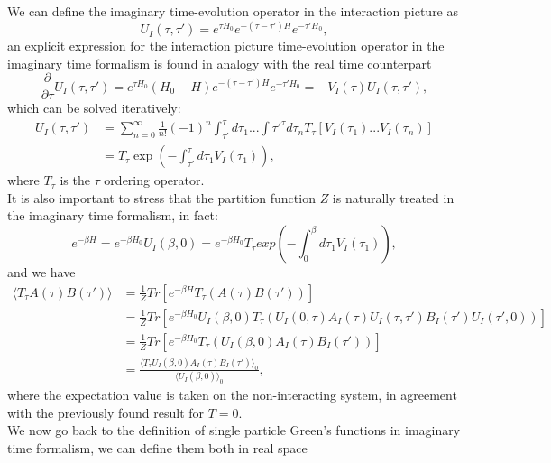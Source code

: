 We can define the imaginary time-evolution operator in the interaction picture as 
\begin{equation}
    U_I(\tau,\tau')=e^{\tau H_0}e^{-(\tau-\tau')H}e^{-\tau'H_0},
\end{equation}
an explicit expression for the interaction picture time-evolution operator in the imaginary time formalism is found in analogy with 
the real time counterpart
\begin{equation}
    \frac{\partial}{\partial\tau} U_I(\tau,\tau')=e^{\tau H_0}(H_0-H)e^{-(\tau-\tau')H}e^{-\tau'H_0}=-V_I(\tau)U_I(\tau,\tau'),
\end{equation}
which can be solved iteratively:
\begin{equation}
\begin{split}
    U_I(\tau,\tau')&=\sum_{n=0}^\infty\frac{1}{n!}(-1)^n\int_{\tau'}^{\tau}d\tau_1...\int{\tau'}^{\tau}d\tau_nT_\tau\left[V_I(\tau_1)...V_I(\tau_n)\right]\\
    &=T_\tau\exp{\left(-\int_{\tau'}^\tau d\tau_1V_I(\tau_1)\right)},
\end{split}
\end{equation}
where $T_\tau$ is the $\tau$ ordering operator.\\
It is also important to stress that the partition function $Z$ is naturally treated in the imaginary time formalism, in fact:
\begin{equation}
    e^{-\beta H}=e^{-\beta H_0}U_I(\beta,0)=e^{-\beta H_0}T_\tau exp{\left(-\int_{0}^{\beta}d\tau_1V_I(\tau_1)\right)},
\end{equation}
and we have
\begin{equation}
\begin{split}
    \langle T_\tau A(\tau)B(\tau')\rangle &= \frac{1}{Z}Tr\left[e^{-\beta H}T_\tau(A(\tau)B(\tau'))\right]\\
    &=\frac{1}{Z}Tr\left[e^{-\beta H_0}U_I(\beta,0)T_\tau(U_I(0,\tau)A_I(\tau)U_I(\tau,\tau')B_I(\tau')U_I(\tau',0)) \right]\\
    &=\frac{1}{Z}Tr\left[e^{-\beta H_0}T_\tau(U_I(\beta,0)A_I(\tau)B_I(\tau'))\right]\\
    &=\frac{\langle T_\tau U_I(\beta,0)A_I(\tau)B_I(\tau')\rangle_0}{\langle U_I(\beta,0)\rangle_0},
\end{split}
\end{equation}
where the expectation value is taken on the non-interacting system, in agreement with the previously found result for $T=0$.\\
We now go back to the definition of single particle Green's functions in imaginary time formalism, we can define them both in real space 
